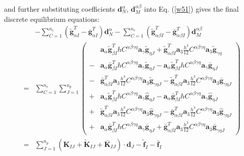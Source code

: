 and further substituting coefficients $\boldsymbol d_N^\alpha$, $\boldsymbol d_M^{\alpha\beta}$ into Eq. (\ref{w51}) gives the final discrete equilibrium equations: 
\begin{equation}
\begin{split}
&- \sum_{C=1}^{n_c}(\tilde{\boldsymbol g}^T_{\alpha I} - \bar{\boldsymbol g}^T_{\alpha I}) \boldsymbol d_N^{\alpha}
- \sum_{C=1}^{n_c}(\tilde{\boldsymbol g}^T_{\alpha\beta I} - \bar{\boldsymbol g}^T_{\alpha\beta I}) \boldsymbol d_M^{\alpha\beta} \\
= &\sum_{C=1}^{n_e} \sum_{J=1}^{n_p} \left (
\begin{split}
& \boldsymbol a_\alpha \tilde{\boldsymbol g}^T_{\beta I} h C^{\alpha\beta\gamma\eta} \boldsymbol a_\gamma \tilde{\boldsymbol g}_{\eta J} 
+ \tilde{\boldsymbol g}^T_{\alpha\beta I} \boldsymbol a_3 \frac{h^3}{12}C^{\alpha\beta\gamma\eta} \boldsymbol a_3 \tilde{\boldsymbol g}_{\gamma\eta} \\
- & \boldsymbol a_\alpha \bar{\boldsymbol g}^T_{\beta I} h C^{\alpha\beta\gamma\eta} \boldsymbol a_\gamma \tilde{\boldsymbol g}_{\eta J} - \boldsymbol a_\alpha \tilde{\boldsymbol g}^T_{\beta I} h C^{\alpha\beta\gamma\eta} \boldsymbol a_\gamma \bar{\boldsymbol g}_{\eta J} \\
- & \bar{\boldsymbol g}^T_{\alpha\beta I}\boldsymbol a_3 \frac{h^3}{12} C^{\alpha\beta\gamma\eta} \boldsymbol a_3 \tilde{\boldsymbol g}_{\gamma\eta J} - \tilde{\boldsymbol g}^T_{\alpha\beta I} \boldsymbol a_3 \frac{h^3}{12} C^{\alpha\beta\gamma\eta} \boldsymbol a_3 \bar{\boldsymbol g}_{\gamma\eta J} \\
+ & \boldsymbol a_\alpha \tilde{\boldsymbol g}^T_{\beta I} h C^{\alpha\beta\gamma\eta} \boldsymbol a_\gamma \hat{\boldsymbol g}_{\eta J}
- \boldsymbol a_\alpha \bar{\boldsymbol g}^T_{\beta I} h C^{\alpha\beta\gamma\eta} \boldsymbol a_\gamma \hat{\boldsymbol g}_{\eta J} \\
+ & \tilde{\boldsymbol g}^T_{\alpha\beta I}\boldsymbol a_3 \frac{h^3}{12} C^{\alpha\beta\gamma\eta} \boldsymbol a_3 \hat{\boldsymbol g}_{\gamma\eta J} - \bar{\boldsymbol g}^T_{\alpha\beta I} \boldsymbol a_3 \frac{h^3}{12} C^{\alpha\beta\gamma\eta} \boldsymbol a_3 \hat{\boldsymbol g}_{\gamma\eta J} \\
+ & \boldsymbol a_\alpha \bar{\boldsymbol g}^T_{\beta I} h C^{\alpha\beta\gamma\eta} \boldsymbol a_\gamma \bar{\boldsymbol g}_{\eta J}
+ \bar{\boldsymbol g}^T_{\alpha\beta I}\boldsymbol a_3 \frac{h^3}{12} C^{\alpha\beta\gamma\eta} \boldsymbol a_3 \bar{\boldsymbol g}_{\gamma\eta J} 
\end{split}
\right ) \\
= &\sum_{J=1}^{n_p} (\boldsymbol K_{IJ}+\tilde{\boldsymbol K}_{IJ}+\bar{\boldsymbol K}_{IJ}) \cdot \boldsymbol d_J - \tilde{\boldsymbol f}_I - \bar{\boldsymbol f}_I
\end{split}
\end{equation}

